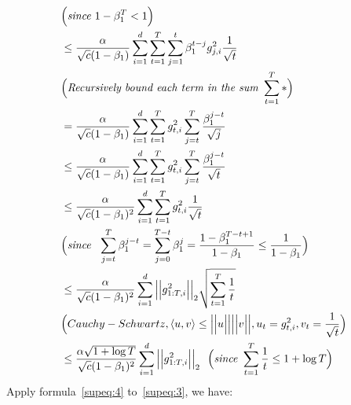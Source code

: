 \documentclass{article}
\begin{document}
\begin{align}
    & \Big( \textit{since\ }1 - \beta_1^T < 1 \Big ) \nonumber \\
    & \leq \frac{\alpha}{\sqrt{c} (1 - \beta_1)} \sum_{i=1}^d \sum_{t=1}^T \sum_{j=1}^t \beta_1^{t-j} g_{j,i}^2 \frac{1}{\sqrt{t}} \nonumber \\
    &\Big( \textit{Recursively\ bound\ each\ term\ in\ the\ sum\ }\sum_{t=1}^T *  \Big) \nonumber \\
    & = \frac{\alpha}{\sqrt{c} (1 - \beta_1)} \sum_{i=1}^d \sum_{t=1}^T g_{t,i}^2 \sum_{j=t}^T  \frac{\beta_1^{j-t}}{\sqrt{j}} \nonumber \\
    & \leq \frac{\alpha}{\sqrt{c} (1 - \beta_1)} \sum_{i=1}^d \sum_{t=1}^T g_{t,i}^2 \sum_{j=t}^T  \frac{\beta_1^{j-t}}{\sqrt{t}} \nonumber \\
    & \leq \frac{\alpha}{\sqrt{c} (1 - \beta_1)^2} \sum_{i=1}^d \sum_{t=1}^T g_{t,i}^2 \frac{1}{\sqrt{t}} \nonumber \\
    &\Big( \textit{since \ } \sum_{j=t}^T \beta_1^{j-t} = \sum_{j=0}^{T-t} \beta_1^{j} = \frac{1 - \beta_1^{T-t+1}}{1 - \beta_1} \leq \frac{1}{1 - \beta_1}\Big) \nonumber \\
    & \leq \frac{\alpha}{{\color{black}\sqrt{c}} (1 - \beta_1)^2} \sum_{i=1}^d \Big \vert \Big \vert g_{1:T,i}^{{\color{black}2}} \Big \vert \Big \vert_2 \sqrt{\sum_{t=1}^T \frac{1}{t}} \nonumber \\
    &\Big(Cauchy-Schwartz, \langle u,v \rangle  \leq \Big \vert \Big \vert u \Big \vert \Big \vert \Big \vert \Big \vert v \Big \vert \Big \vert, u_t = g_{t,i}^2, v_t = \frac{1}{\sqrt{t}} \Big) \nonumber \\
    & \leq \frac{\alpha \sqrt{1 + \log T}}{{\color{black}\sqrt{c}} (1 - \beta_1)^2} \sum_{i=1}^d \Big \vert \Big \vert g_{1:T,i}^{{\color{black} 2}} \Big \vert \Big \vert_2 \ \ \Big( \textit{since\ } \sum_{t=1}^T \frac{1}{t} \leq 1 + \log T \Big)
\end{align}
Apply formula~\eqref{supeq:4} to~\eqref{supeq:3}, we have:
\end{document}
